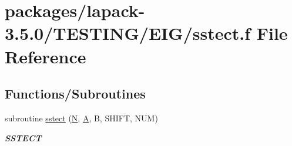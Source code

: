 \hypertarget{sstect_8f}{}\section{packages/lapack-\/3.5.0/\+T\+E\+S\+T\+I\+N\+G/\+E\+I\+G/sstect.f File Reference}
\label{sstect_8f}
\subsection*{Functions/\+Subroutines}
\begin{DoxyCompactItemize}
\item 
subroutine \hyperlink{group__single__eig_ga1f72bc4c21b1b37d449ec5911e36d7d1}{sstect} (\hyperlink{polmisc_8c_a0240ac851181b84ac374872dc5434ee4}{N}, \hyperlink{classA}{A}, B, S\+H\+I\+F\+T, N\+U\+M)
\begin{DoxyCompactList}\small\item\em {\bfseries S\+S\+T\+E\+C\+T} \end{DoxyCompactList}\end{DoxyCompactItemize}
